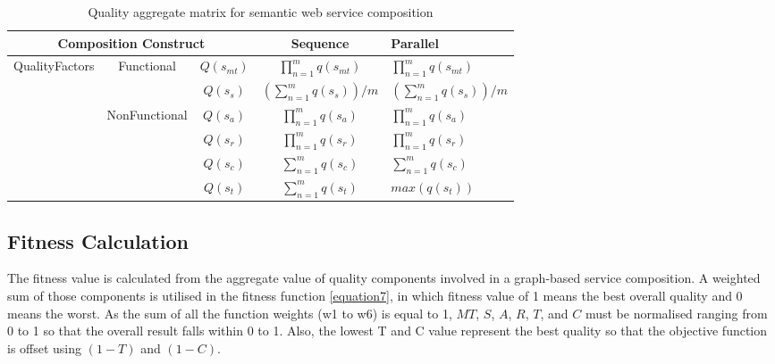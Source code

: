 \documentclass{llncs}
\begin{document}
\begin{table}[]
\centering
\caption{Quality aggregate matrix for semantic web service composition}
\label{table1}
\begin{tabular}{|c|c|c|c|l|}
\hline
\multicolumn{3}{|c|}{Composition Construct}                                      & Sequence                             & Parallel \\ \hline
\multirow{5}{*}{QualityFactors} & \multirow{2}{*}{Functional}    & $Q(s_ {mt})$  &$\prod_{n=1}^{m} q(s_ {mt})$          &  $\prod_{n=1}^{m} q(s_ {mt})$ \\ \cline{3-5}
                                &                                & $Q(s_ {s})$  & $(\sum_{n=1}^m q(s_ {s}))/m$        &  $(\sum_{n=1}^m q(s_ {s}))/m$  \\ \cline{2-5}   
                                & \multirow{4}{*}{NonFunctional} & $Q(s_{a})$    & $\prod_{n=1}^{m} q(s_a)$             &  $\prod_{n=1}^{m} q(s_a)$ \\ \cline{3-5} 
                                &                                & $Q(s_{r})$    & $\prod_{n=1}^{m} q(s_r)$             &  $\prod_{n=1}^{m} q(s_r)$ \\ \cline{3-5} 
                                &                                & $Q(s_{c})$    & $\sum_{n=1}^m q(s_ {c})$             &  $\sum_{n=1}^m q(s_ {c})$ \\ \cline{3-5} 
                                &                                & $Q(s_{t})$    & $\sum_{n=1}^m q(s_ {t})$             &  $max(q(s_ {t}))$ \\ \hline
\end{tabular}
\end{table}

\subsection{Fitness Calculation}
The fitness value is calculated from the aggregate value of quality components involved in a graph-based service composition. A weighted sum of those components is utilised in the fitness function \ref{equation7}, in which fitness value of 1 means the best overall quality and 0 means the worst. As the sum of all the function weights (w1 to w6) is equal to 1, $MT$, $S$, $A$, $R$, $T$, and $C$ must be normalised ranging from 0 to 1 so that the overall result falls within 0 to 1. Also, the lowest T and C value represent the best quality so that the objective function is offset using $(1 - T)$ and $(1 - C)$.
\end{document}

